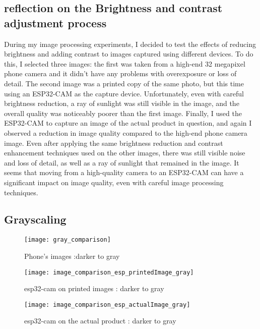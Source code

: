 \subsection{reflection on the Brightness and contrast adjustment process}
During my image processing experiments, I decided to test the effects of reducing brightness and adding contrast to images captured using different devices. To do this, I selected three images: the first was taken from a high-end 32 megapixel phone camera and it didn't have any problems with overexposure or loss of detail. The second image was a printed copy of the same photo, but this time using an ESP32-CAM as the capture device. Unfortunately, even with careful brightness reduction, a ray of sunlight was still visible in the image, and the overall quality was noticeably poorer than the first image. Finally, I used the ESP32-CAM to capture an image of the actual product in question, and again I observed a reduction in image quality compared to the high-end phone camera image. Even after applying the same brightness reduction and contrast enhancement techniques used on the other images, there was still visible noise and loss of detail, as well as a ray of sunlight that remained in the image. It seems that moving from a high-quality camera to an ESP32-CAM can have a significant impact on image quality, even with careful image processing techniques.
\subsection{Grayscaling}

\FloatBarrier
\begin{figure}[h]
\FloatBarrier
         \centering
        \texttt{[image: gray\_comparison]}
   
        \caption{Phone's images :darker to gray}
        \label{fig:Phone's images : darker to gray}
\FloatBarrier
    \end{figure}


\FloatBarrier
\FloatBarrier
\begin{figure}[h]
\FloatBarrier
         \centering
        \texttt{[image: image\_comparison\_esp\_printedImage\_gray]}
   
        \caption{esp32-cam on printed images : darker to gray}
        \label{fig:esp32-cam on printed images :  darker to gray}
\FloatBarrier
    \end{figure}


\FloatBarrier
\FloatBarrier
\begin{figure}[h]
\FloatBarrier
         \centering
        \texttt{[image: image\_comparison\_esp\_actualImage\_gray]}
   
        \caption{esp32-cam on the actual product : darker to gray}
        \label{fig:Phone's images :  darker to gray}
\FloatBarrier
    \end{figure}


